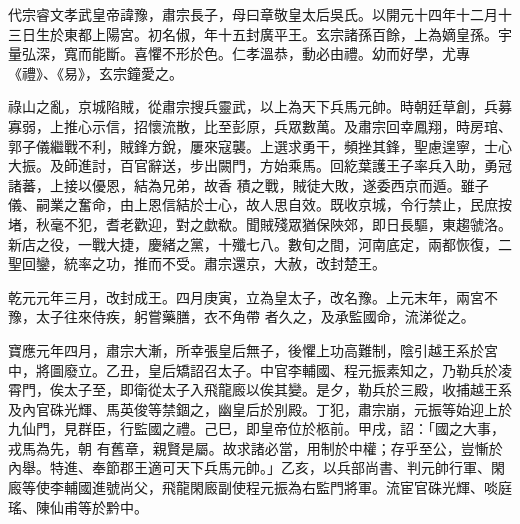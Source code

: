 
\begin{pinyinscope}

 代宗睿文孝武皇帝諱豫，肅宗長子，母曰章敬皇太后吳氏。以開元十四年十二月十三日生於東都上陽宮。初名俶，年十五封廣平王。玄宗諸孫百餘，上為嫡皇孫。宇量弘深，寬而能斷。喜懼不形於色。仁孝溫恭，動必由禮。幼而好學，尤專《禮》、《易》，玄宗鐘愛之。



 祿山之亂，京城陷賊，從肅宗搜兵靈武，以上為天下兵馬元帥。時朝廷草創，兵募寡弱，上推心示信，招懷流散，比至彭原，兵眾數萬。及肅宗回幸鳳翔，時房琯、郭子儀繼戰不利，賊鋒方銳，屢來寇襲。上選求勇干，頻挫其鋒，聖慮遑寧，士心大振。及師進討，百官辭送，步出闕門，方始乘馬。回紇葉護王子率兵入助，勇冠諸蕃，上接以優恩，結為兄弟，故香
 積之戰，賊徒大敗，遂委西京而遁。雖子儀、嗣業之奮命，由上恩信結於士心，故人思自效。既收京城，令行禁止，民庶按堵，秋毫不犯，耆老歡迎，對之歔欷。聞賊殘眾猶保陜郊，即日長驅，東趨虢洛。新店之役，一戰大捷，慶緒之黨，十殲七八。數旬之間，河南底定，兩都恢復，二聖回鑾，統率之功，推而不受。肅宗還京，大赦，改封楚王。



 乾元元年三月，改封成王。四月庚寅，立為皇太子，改名豫。上元末年，兩宮不豫，太子往來侍疾，躬嘗藥膳，衣不角帶
 者久之，及承監國命，流涕從之。



 寶應元年四月，肅宗大漸，所幸張皇后無子，後懼上功高難制，陰引越王系於宮中，將圖廢立。乙丑，皇后矯詔召太子。中官李輔國、程元振素知之，乃勒兵於凌霄門，俟太子至，即衛從太子入飛龍廄以俟其變。是夕，勒兵於三殿，收捕越王系及內官硃光輝、馬英俊等禁錮之，幽皇后於別殿。丁犯，肅宗崩，元振等始迎上於九仙門，見群臣，行監國之禮。己巳，即皇帝位於柩前。甲戌，詔：「國之大事，戎馬為先，朝
 有舊章，親賢是屬。故求諸必當，用制於中權；存乎至公，豈慚於內舉。特進、奉節郡王適可天下兵馬元帥。」乙亥，以兵部尚書、判元帥行軍、閑廄等使李輔國進號尚父，飛龍閑廄副使程元振為右監門將軍。流宦官硃光輝、啖庭瑤、陳仙甫等於黔中。




\end{pinyinscope}
